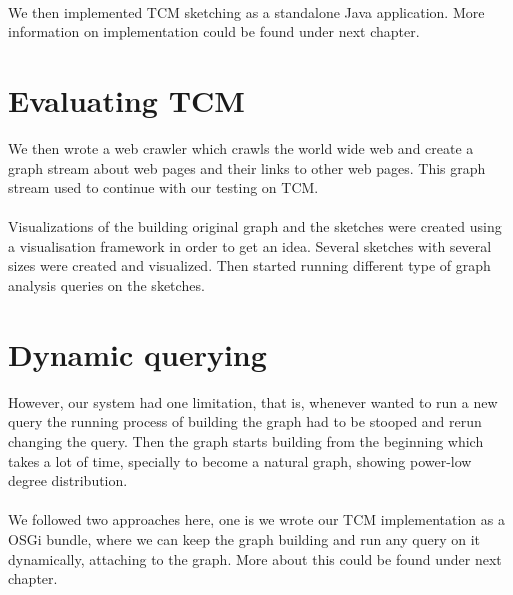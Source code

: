 \documentclass[12pt]{report}
\numberwithin{figure}{section}
\numberwithin{table}{section}
\begin{document}
\paragraph{}

We then implemented TCM sketching as a standalone Java application. More information on implementation could be found under next chapter.

\section{Evaluating TCM}

We then wrote a web crawler which crawls the world wide web and create a graph stream about web pages and their links to other web pages. This graph stream used to continue with our testing on TCM. 

\paragraph{}

Visualizations of the building original graph and the sketches were created using a visualisation framework in order to get an idea. Several sketches with several sizes were created and visualized. Then started running different type of graph analysis queries on the sketches. 

\section{Dynamic querying}

However, our system had one limitation, that is, whenever wanted to run a new query the running process of building the graph had to be stooped and rerun changing the query. Then the graph starts building from the beginning which takes a lot of time, specially to become a  natural graph, showing power-low degree distribution. 

\paragraph{}

We followed two approaches here, one is we wrote our TCM implementation as a OSGi bundle, where we can keep the graph building and run any query on it dynamically, attaching to the graph. More about this could be found under next chapter. 

\paragraph{}
\end{document}
